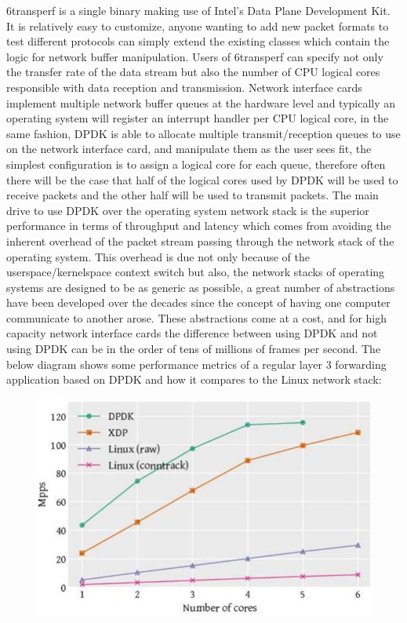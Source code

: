 \documentclass[a4paper,12p,titlepage]{article}
\begin{document}
6transperf is a single binary making use of Intel’s Data Plane Development Kit. It is relatively easy to customize, anyone wanting to add new packet formats to test different protocols can simply extend the existing classes which contain the logic for network buffer manipulation. Users of 6transperf can specify not only the transfer rate of the data stream but also the number of CPU logical cores responsible with data reception and transmission. Network interface cards implement multiple network buffer queues at the hardware level and typically an operating system will register an interrupt handler per CPU logical core, in the same fashion, DPDK is able to allocate multiple transmit/reception queues to use on the network interface card, and manipulate them as the user sees fit, the simplest configuration is to assign a logical core for each queue, therefore often there will be the case that half of the logical cores used by DPDK will be used to receive packets and the other half will be used to transmit packets. The main drive to use DPDK over the operating system network stack is the superior performance in terms of throughput and latency which comes from avoiding the inherent overhead of the packet stream passing through the network stack of the operating system. This overhead is due not only because of the userspace/kernelspace context switch but also, the network stacks of operating systems are designed to be as generic as possible, a great number of abstractions have been developed over the decades since the concept of having one computer communicate to another arose. These abstractions come at a cost, and for high capacity network interface cards the difference between using DPDK and not using DPDK can be in the order of tens of millions of frames per second. The below diagram shows some performance metrics of a regular layer 3 forwarding application based on DPDK and how it compares to the Linux network stack:

\begin{figure}[h]
\centering
\includegraphics[width=\textwidth]{dpdk}
\end{figure}
\end{document}
